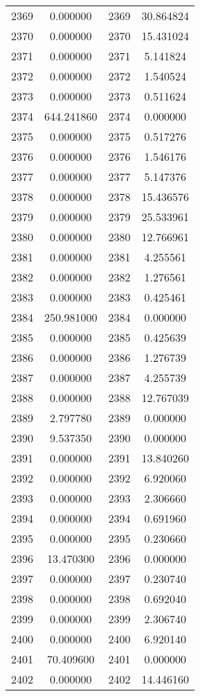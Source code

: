 \documentclass[12pt]{article}
\begin{document}
\begin{longtable}{@{}cccc@{}}
2369 & 0.000000 & 2369 & 30.864824 \\
2370 & 0.000000 & 2370 & 15.431024 \\
2371 & 0.000000 & 2371 & 5.141824 \\
2372 & 0.000000 & 2372 & 1.540524 \\
2373 & 0.000000 & 2373 & 0.511624 \\
2374 & 644.241860 & 2374 & 0.000000 \\
2375 & 0.000000 & 2375 & 0.517276 \\
2376 & 0.000000 & 2376 & 1.546176 \\
2377 & 0.000000 & 2377 & 5.147376 \\
2378 & 0.000000 & 2378 & 15.436576 \\
2379 & 0.000000 & 2379 & 25.533961 \\
2380 & 0.000000 & 2380 & 12.766961 \\
2381 & 0.000000 & 2381 & 4.255561 \\
2382 & 0.000000 & 2382 & 1.276561 \\
2383 & 0.000000 & 2383 & 0.425461 \\
2384 & 250.981000 & 2384 & 0.000000 \\
2385 & 0.000000 & 2385 & 0.425639 \\
2386 & 0.000000 & 2386 & 1.276739 \\
2387 & 0.000000 & 2387 & 4.255739 \\
2388 & 0.000000 & 2388 & 12.767039 \\
2389 & 2.797780 & 2389 & 0.000000 \\
2390 & 9.537350 & 2390 & 0.000000 \\
2391 & 0.000000 & 2391 & 13.840260 \\
2392 & 0.000000 & 2392 & 6.920060 \\
2393 & 0.000000 & 2393 & 2.306660 \\
2394 & 0.000000 & 2394 & 0.691960 \\
2395 & 0.000000 & 2395 & 0.230660 \\
2396 & 13.470300 & 2396 & 0.000000 \\
2397 & 0.000000 & 2397 & 0.230740 \\
2398 & 0.000000 & 2398 & 0.692040 \\
2399 & 0.000000 & 2399 & 2.306740 \\
2400 & 0.000000 & 2400 & 6.920140 \\
2401 & 70.409600 & 2401 & 0.000000 \\
2402 & 0.000000 & 2402 & 14.446160 \\

\end{longtable}
\end{document}
